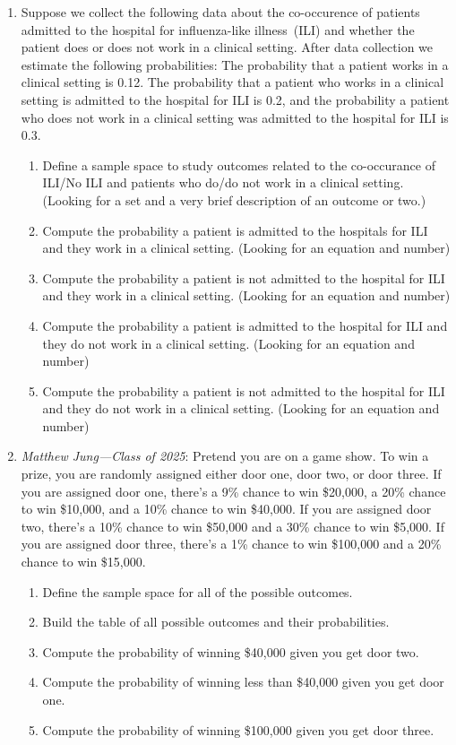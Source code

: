 \begin{enumerate}
   \item Suppose we collect the following data about the co-occurence of patients admitted to the hospital for influenza-like illness~(ILI) and whether the patient does or does not work in a clinical setting. 
   After data collection we estimate the following probabilities: The probability that a patient works in a clinical setting is 0.12. The probability that a patient who works in a clinical setting is admitted to the hospital for ILI is 0.2, and the probability a patient who does not work in a clinical setting was admitted to the hospital for ILI is 0.3. 
   \begin{enumerate}
       \item Define a sample space to study outcomes related to the co-occurance of ILI/No ILI and patients who do/do not work in a clinical setting. (Looking for a set and a very brief description of an outcome or two.) 
       \item Compute the probability a patient is admitted to the hospitals for ILI and they work in a clinical setting. (Looking for an equation and number)
       \item Compute the probability a patient is not admitted to the hospital for ILI and they work in a clinical setting. (Looking for an equation and number)
       \item Compute the probability a patient is admitted to the hospital for ILI and they do not work in a clinical setting. (Looking for an equation and number)
       \item Compute the probability a patient is not admitted to the hospital for ILI and they do not work in a clinical setting. (Looking for an equation and number)
   \end{enumerate}
   
      \item \textit{Matthew Jung---Class of 2025}: Pretend you are on a game show. To win a prize, you are randomly assigned either door one, door two, or door three. 
   If you are assigned door one, there's a 9\% chance to win \$20,000, a 20\% chance to win \$10,000, and a 10\% chance to win \$40,000. 
   If you are assigned door two, there's a 10\% chance to win \$50,000 and a 30\% chance to win \$5,000.
   If you are assigned door three, there's a 1\% chance to win \$100,000 and a 20\% chance to win \$15,000.

    \begin{enumerate}
        \item Define the sample space for all of the possible outcomes.
        \item Build the table of all possible outcomes and their probabilities.
        \item Compute the probability of winning \$40,000 given you get door two.
        \item Compute the probability of winning less than \$40,000 given you get door one.
        \item Compute the probability of winning \$100,000 given you get door three.
    \end{enumerate}
   

\end{enumerate}
